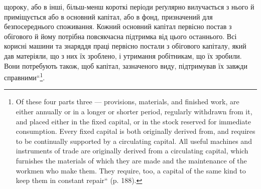 \parcont{}  %
щороку, або в інші, більш-менш короткі періоди реґулярно вилучається
з нього й приміщується або в основний капітал, або в фонд, призначений
для безпосереднього споживання. Кожний основний капітал первісно
постав з обігового й йому потрібна повсякчасна підтримка від цього
останнього. Всі корисні машини та знаряддя праці первісно постали з
обігового капіталу, який дав матеріяли, що з них їх зроблено, і утримання
робітникам, що їх зробили. Вони потребують також, щоб капітал,
зазначеного виду, підтримував їх завжди справними“\footnote*{
Of these four parts three — provisions, materials, and finished work, are either
annually or in a longer or shorter period, regularly withdrawn from it, and placed
either in the fixed capital, or in the stock reserved for immediate consumption.
Every fixed capital is both originally derived from, and requires to be continually
supported by a circulating capital. All useful machines and instruments of trade are
originally derived from a circulating capital, which furnishes the materials of which
they are made and the maintenance of the workmen who make them. They require,
too, a capital of the same kind to keep them in constant repair“ (p. 188).
}.

